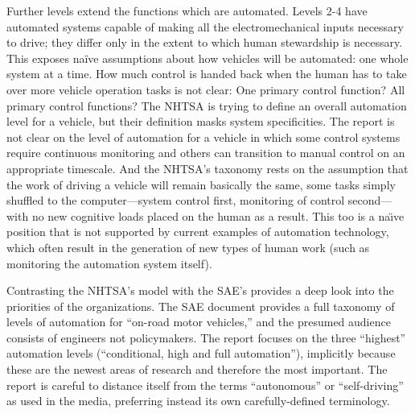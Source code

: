 Further levels extend the functions which are automated. Levels 2-4
have automated systems capable of making all the electromechanical
inputs necessary to drive; they differ only in the extent to which
human stewardship is necessary.\cite{???} This exposes naïve assumptions about
how vehicles will be automated: one whole system at a time. How much
control is handed back when the human has to take over more vehicle
operation tasks is not clear: One primary control function? All
primary control functions? The NHTSA is trying to define an overall
automation level for a vehicle, but their definition masks system
specificities. The report is not clear on the level of automation for
a vehicle in which some control systems require continuous monitoring
and others can transition to manual control on an appropriate
timescale. And the NHTSA's taxonomy rests on the assumption that the
work of driving a vehicle will remain basically the same, some tasks
simply shuffled to the computer—system control first, monitoring of
control second—with no new cognitive loads placed on the human as a
result. This too is a na\"{\i}ve position that is not supported by current
examples of automation technology, which often result in the
generation of new types of human work (such as monitoring the
automation system itself).

Contrasting the NHTSA's model with the SAE's provides a deep look into
the priorities of the organizations. The SAE document provides a full
taxonomy of levels of automation for ``on-road motor vehicles,'' and the
presumed audience consists of engineers not policymakers.\cite{???} The report
focuses on the three ``highest'' automation levels (``conditional, high
and full automation''), implicitly because these are the newest areas
of research and therefore the most important. The report is careful to
distance itself from the terms ``autonomous'' or ``self-driving'' as used
in the media, preferring instead its own carefully-defined
terminology.\cite{???} 

